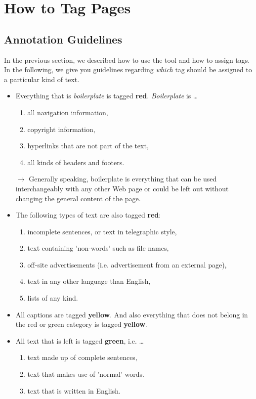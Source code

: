 \documentclass[12pt]{article}
\begin{document}
\section{How to Tag Pages}

\subsection{Annotation Guidelines}
\label{Annotation}
In the previous section, we described how to use the tool and how to assign tags. In the following, we give you guidelines regarding \emph{which} tag should be assigned to a particular kind of text.

\begin{itemize}
	\item Everything that is \emph{boilerplate} is tagged \textbf{red}. \emph{Boilerplate} is \ldots
	\begin{enumerate}
		\item all navigation information,
		\item copyright information,
		\item hyperlinks that are not part of the text,
		\item all kinds of headers and footers.
	\end{enumerate}
	$\rightarrow$ Generally speaking, boilerplate is everything that can be used interchangeably with any other Web page or could be left out without changing the general content of the page.
	\item The following types of text are also tagged \textbf{red}:
	\begin{enumerate}
		\item incomplete sentences, or text in telegraphic style,
		\item text containing 'non-words' such as file names,
		\item off-site advertisements (i.e. advertisement from an external page),
		\item text in any other language than English,
		\item lists of any kind.
	\end{enumerate}
	\item All captions are tagged \textbf{yellow}. And also everything that does not belong in the red or green category is tagged \textbf{yellow}.
	\item All text that is left is tagged \textbf{green}, i.e. \ldots
	\begin{enumerate}
		\item text made up of complete sentences,
		\item text that makes use of 'normal' words.
		\item text that is written in English.
	\end{enumerate}
\end{itemize}
\end{document}

